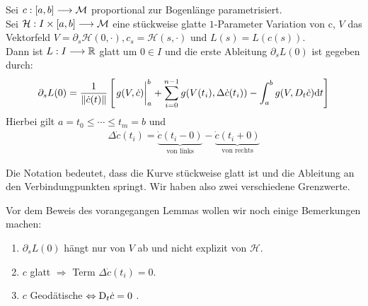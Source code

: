 \begin{satz}
Sei $c:[a, b] \longrightarrow \mathcal{M}$ proportional zur Bogenlänge parametrisiert. \\
Sei $\mathcal{H}: I \times [a, b] \longrightarrow \mathcal{M}$ eine stückweise glatte $1$-Parameter Variation von c, $V$ das Vektorfeld $V=\partial_s\mathcal{H}(0,\cdot), c_s=\mathcal{H}(s,\cdot)$ und $L(s) = L(c(s))$. \\
Dann ist $L: I \longrightarrow \mathbb{R}$ glatt um $0 \in I$ und die erste Ableitung $\partial_sL(0)$ ist gegeben durch:
\begin{align*}
\partial_sL(0) = \frac{1}{\norm{\dot{c}(t)}}\left[\eval{g(V,\dot{c})}_{a}^{b} + \sum_{i=0}^{n-1}g(V(t_i),\Delta\dot{c}(t_i))- \int_{a}^{b}g(V,D_t\dot{c})\dd t\right]
\end{align*}
Hierbei gilt $a=t_0 \leq \cdots \leq t_m=b $ und 
\begin{align*}
\Delta\dot{c}(t_i) = \underbrace{\dot{c}(t_i-0)}_{\text{von links}} - \underbrace{\dot{c}(t_i+0)}_{\text{von rechts}}
\end{align*}
\end{satz}
Die Notation bedeutet, dass die Kurve stückweise glatt ist und die Ableitung an den Verbindungpunkten  springt. Wir haben also zwei verschiedene Grenzwerte.
\begin{bem}
Vor dem Beweis des vorangegangen Lemmas wollen wir noch einige Bemerkungen machen:
\begin{enumerate}
\item $\partial_sL(0)$ hängt nur von $V$ ab und nicht explizit von $\mathcal{H}$.
\item $c$ glatt $\Rightarrow$ Term $\Delta\dot{c}(t_i)=0$.
\item $c $ Geodätische $\Leftrightarrow \mathrm{D}_t\dot{c} = 0$ .
\end{enumerate}
\end{bem}
